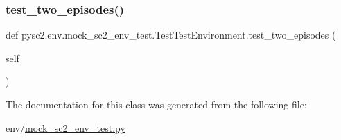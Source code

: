 \subsubsection{\texorpdfstring{test\+\_\+two\+\_\+episodes()}{test\_two\_episodes()}}
{\footnotesize\ttfamily def pysc2.\+env.\+mock\+\_\+sc2\+\_\+env\+\_\+test.\+Test\+Test\+Environment.\+test\+\_\+two\+\_\+episodes (\begin{DoxyParamCaption}\item[{}]{self }\end{DoxyParamCaption})}



The documentation for this class was generated from the following file\+:\begin{DoxyCompactItemize}
\item 
env/\mbox{\hyperlink{mock__sc2__env__test_8py}{mock\+\_\+sc2\+\_\+env\+\_\+test.\+py}}\end{DoxyCompactItemize}
